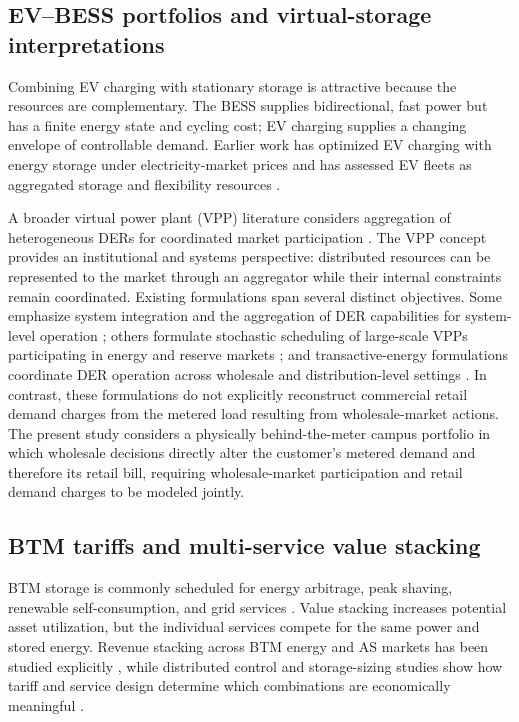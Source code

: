 \documentclass[final,5p,times]{elsarticle}
\begin{document}
\subsection{EV--BESS portfolios and virtual-storage interpretations}
Combining EV charging with stationary storage is attractive because the resources are complementary. The BESS supplies bidirectional, fast power but has a finite energy state and cycling cost; EV charging supplies a changing envelope of controllable demand. Earlier work has optimized EV charging with energy storage under electricity-market prices \cite{jin2013evstorage} and has assessed EV fleets as aggregated storage and flexibility resources \cite{mills2018evstorage}.

A broader virtual power plant (VPP) literature considers aggregation of heterogeneous DERs for coordinated market participation \cite{pudjianto2007vpp,zamani2016vpp,qiu2017transactive}. The VPP concept provides an institutional and systems perspective: distributed resources can be represented to the market through an aggregator while their internal constraints remain coordinated. Existing formulations span several distinct objectives. Some emphasize system integration and the aggregation of DER capabilities for system-level operation \cite{pudjianto2007vpp}; others formulate stochastic scheduling of large-scale VPPs participating in energy and reserve markets \cite{zamani2016vpp}; and transactive-energy formulations coordinate DER operation across wholesale and distribution-level settings \cite{qiu2017transactive}. In contrast, these formulations do not explicitly reconstruct commercial retail demand charges from the metered load resulting from wholesale-market actions. The present study considers a physically behind-the-meter campus portfolio in which wholesale decisions directly alter the customer's metered demand and therefore its retail bill, requiring wholesale-market participation and retail demand charges to be modeled jointly.

\subsection{BTM tariffs and multi-service value stacking}
BTM storage is commonly scheduled for energy arbitrage, peak shaving, renewable self-consumption, and grid services \cite{raoufat2018bess,wu2017analytical,chen2021valueStacking}. Value stacking increases potential asset utilization, but the individual services compete for the same power and stored energy. Revenue stacking across BTM energy and AS markets has been studied explicitly \cite{seward2022revenueStacking}, while distributed control and storage-sizing studies show how tariff and service design determine which combinations are economically meaningful \cite{karandeh2022distributed,zhang2024btmsizing}.
\end{document}
